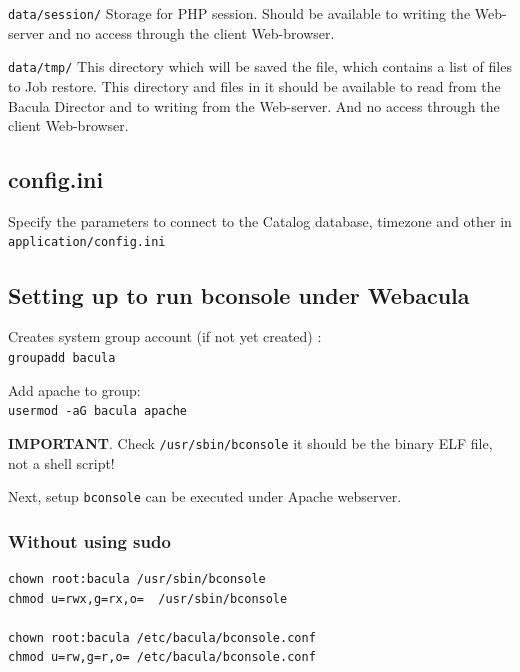 \documentclass[10pt]{article}
\begin{document}
\texttt{data/session/}   Storage for PHP session. Should be available to writing the Web-server and
                  no access through the client Web-browser.

\texttt{data/tmp/}   This directory which will be saved the file, which contains a list of files to Job restore.
                  This directory and files in it should be available to read from the Bacula Director and
                  to writing from the Web-server. And no access through the client Web-browser.




\subsection{config.ini}
\label{Install:config.ini}

Specify the parameters to connect to the Catalog database, timezone and other in \texttt{application/config.ini}




\subsection{Setting up to run bconsole under Webacula}
\label{Install:Setting up to run bconsole under Webacula}

Creates system group account (if not yet created) : \\
\texttt{groupadd bacula}

Add apache to group: \\
\texttt{usermod -aG bacula apache}

\textbf{IMPORTANT}. Check \texttt{/usr/sbin/bconsole} it should be the binary ELF file, not a shell script!

Next, setup \texttt{bconsole} can be executed under Apache webserver.



\subsubsection{Without using sudo}
\label{Install:Setting up to run bconsole from under Webacula:without sudo}

\begin{verbatim}
chown root:bacula /usr/sbin/bconsole
chmod u=rwx,g=rx,o=  /usr/sbin/bconsole

chown root:bacula /etc/bacula/bconsole.conf
chmod u=rw,g=r,o= /etc/bacula/bconsole.conf
\end{verbatim}
\end{document}
